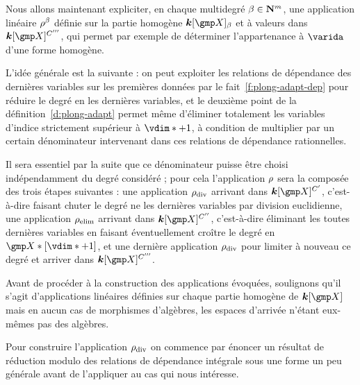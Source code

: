 Nous allons maintenant expliciter, en chaque multidegré \( \beta \in {\mathbf{N}}^m
\), une application linéaire \( \rho^\beta \) définie sur la partie homogène
\( \cdn[ \vmp ]_\beta \) et à valeurs dans \( \cdn[ \vmp ]^{C'''} \), qui
permet par exemple de déterminer l'appartenance à \( \varida \) d'une forme
homogène.

L'idée générale est la suivante : on peut exploiter les relations de
dépendance des dernières variables sur les premières données par le
fait~\ref{f:plong-adapt-dep} pour réduire le degré en les dernières variables,
et le deuxième point de la définition~\ref{d:plong-adapt} permet même
d'éliminer totalement les variables d'indice strictement supérieur à \( \vdim*
  + 1 \), à condition de multiplier par un certain dénominateur intervenant
dans ces relations de dépendance rationnelles.

Il sera essentiel par la suite que ce dénominateur puisse être choisi
indépendamment du degré considéré ; pour cela l'application \( \rho \)
sera la composée des trois étapes suivantes : une application \( \rho\sb{\mathrm{div }} \)
arrivant dans \( \cdn[ \vmp ]^{C'} \), c'est-à-dire faisant chuter le degré ne
les dernières variables par division euclidienne, une application \( \rho\sb{\mathrm{elim}} \)
arrivant dans \( \cdn[ \vmp ]^{C''} \), c'est-à-dire éliminant
les toutes dernières variables en faisant éventuellement croître le degré en
\( \vmp*[\vdim*+1] \), et une dernière application \( \rho\sb{\mathrm{div }} \) pour limiter à
nouveau ce degré et arriver dans \( \cdn[ \vmp ]^{C'''} \).

Avant de procéder à la construction des applications évoquées, soulignons
qu'il s'agit d'applications linéaires définies sur chaque partie homogène de
\( \cdn[ \vmp ] \) mais en aucun cas de morphismes d'algèbres, les espaces
d'arrivée n'étant eux-mêmes pas des algèbres.

Pour construire l'application \( \rho\sb{\mathrm{div }} \) on commence par énoncer un résultat
de réduction modulo des relations de dépendance intégrale sous une forme un
peu générale avant de l'appliquer au cas qui nous intéresse.

